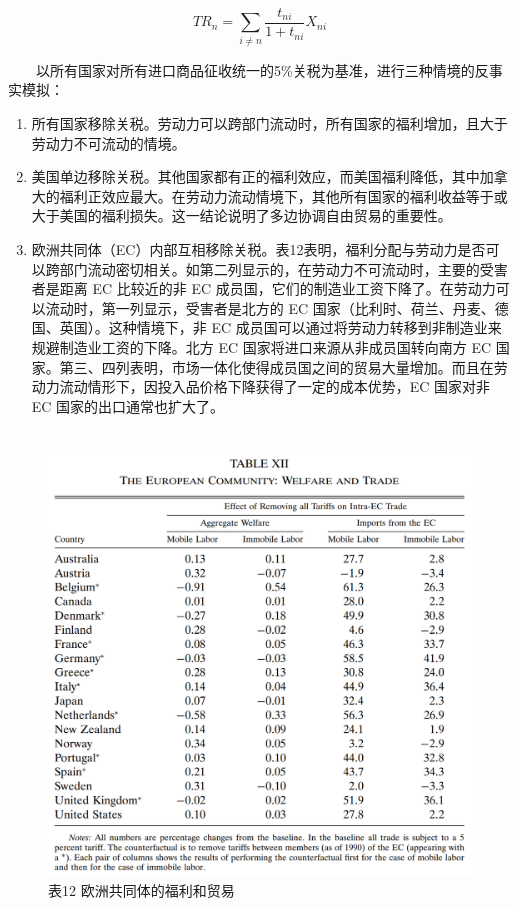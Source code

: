 \documentclass[]{tufte-handout}
\begin{document}
\[
T R_{n}=\sum_{i \neq n} \frac{t_{n i}}{1+t_{n i}} X_{n i}
\]

　　以所有国家对所有进口商品征收统一的5\%关税为基准，进行三种情境的反事实模拟：

\begin{enumerate}
\def\labelenumi{\arabic{enumi}.}
\item
  所有国家移除关税。劳动力可以跨部门流动时，所有国家的福利增加，且大于劳动力不可流动的情境。
\item
  美国单边移除关税。其他国家都有正的福利效应，而美国福利降低，其中加拿大的福利正效应最大。在劳动力流动情境下，其他所有国家的福利收益等于或大于美国的福利损失。这一结论说明了多边协调自由贸易的重要性。
\item
  欧洲共同体（EC）内部互相移除关税。表12表明，福利分配与劳动力是否可以跨部门流动密切相关。如第二列显示的，在劳动力不可流动时，主要的受害者是距离
  EC 比较近的非 EC
  成员国，它们的制造业工资下降了。在劳动力可以流动时，第一列显示，受害者是北方的
  EC 国家（比利时、荷兰、丹麦、德国、英国）。这种情境下，非 EC
  成员国可以通过将劳动力转移到非制造业来规避制造业工资的下降。北方 EC
  国家将进口来源从非成员国转向南方 EC
  国家。第三、四列表明，市场一体化使得成员国之间的贸易大量增加。而且在劳动力流动情形下，因投入品价格下降获得了一定的成本优势，EC
  国家对非 EC 国家的出口通常也扩大了。\\
  　　
\end{enumerate}

\begin{figure}

{\centering \includegraphics[width=1\linewidth]{Figures/Table12} 

}

\caption[表12 欧洲共同体的福利和贸易]{表12 欧洲共同体的福利和贸易}\label{fig:t12}
\end{figure}
\end{document}
